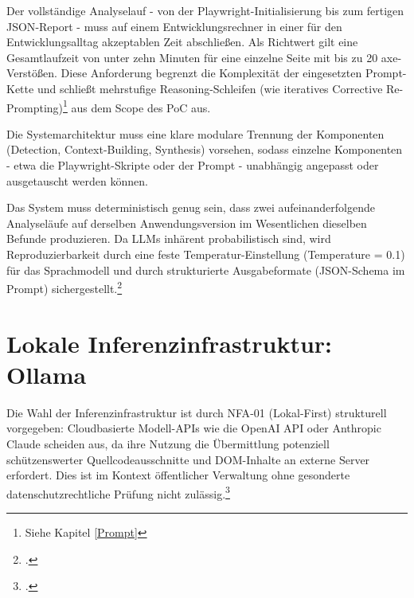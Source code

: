 Der vollständige Analyselauf - von der Playwright-Initialisierung bis zum fertigen \acs{JSON}-Report - muss auf einem Entwicklungsrechner in einer für den Entwicklungsalltag akzeptablen Zeit abschließen. Als Richtwert gilt eine Gesamtlaufzeit von unter zehn Minuten für eine einzelne Seite mit bis zu 20 axe-Verstößen. Diese Anforderung begrenzt die Komplexität der eingesetzten Prompt-Kette und schließt mehrstufige Reasoning-Schleifen (wie iteratives Corrective Re-Prompting)\footnote{Siehe Kapitel \ref{Prompt}} aus dem Scope des \ac{PoC} aus.


Die Systemarchitektur muss eine klare modulare Trennung der Komponenten (Detection, Context-Building, Synthesis) vorsehen, sodass einzelne Komponenten - etwa die Playwright-Skripte oder der Prompt - unabhängig angepasst oder ausgetauscht werden können.


Das System muss deterministisch genug sein, dass zwei aufeinanderfolgende Analyseläufe auf derselben Anwendungsversion im Wesentlichen dieselben Befunde produzieren. Da \ac{LLM}s inhärent probabilistisch sind, wird Reproduzierbarkeit durch eine feste Temperatur-Einstellung (Temperature = 0.1) für das Sprachmodell und durch strukturierte Ausgabeformate (\acs{JSON}-Schema im Prompt) sichergestellt.\footcites[Vgl.][Temperature]{OpenAI_Developers}[Vgl.][Temperature]{Anthropic_API_Docs}

\section{Lokale Inferenzinfrastruktur: Ollama}\label{kap:4.4}
 
 
Die Wahl der Inferenzinfrastruktur ist durch \ac{NFA}-01 (Lokal-First) strukturell vorgegeben: Cloudbasierte Modell-\ac{API}s wie die OpenAI API oder Anthropic Claude scheiden aus, da ihre Nutzung die Übermittlung potenziell schützenswerter Quellcodeausschnitte und \ac{DOM}-Inhalte an externe Server erfordert. Dies ist im Kontext öffentlicher Verwaltung ohne gesonderte datenschutzrechtliche Prüfung nicht zulässig.\footcite[Vgl.][Art. 28 und Art. 44 ff.]{dsgvo2016}
 
